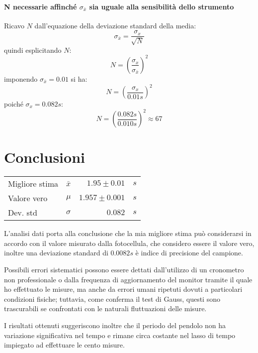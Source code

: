 \documentclass{article}
\begin{document}
	\noindent
	\paragraph{N necessarie affinché $\sigma_{\bar{x}}$ sia uguale alla sensibilità dello strumento}
	Ricavo $N$ dall'equazione della deviazione standard della media:
	\[
	\sigma_{\bar{x}} = \frac{\sigma_{x}}{\sqrt{N}} 
	\]
	quindi esplicitando $N$:
	\[
	N = \left(\frac{\sigma_x}{\sigma_{\bar{x}}}\right)^2
	\]
	imponendo $\sigma_{\bar{x}} = 0.01$ si ha:
	\[
	N = \left(\frac{\sigma_x}{0.01s}\right)^2
	\]
	poiché $\sigma_x = 0.082s$:
	\[
	N = \left(\frac{0.082s}{0.010s}\right)^2 \approx 67
	\]
	
	
	
\vspace{1.2cm}
	\section{Conclusioni}
	\textcolor{white}{ }
	
	\begin{minipage}[c]{1\textwidth}
	\centering
	\begin{tabular}{llrl}
		Migliore stima           & $\bar{x}$             & $1.95 \pm 0.01$        & $s$       \\
		Valore vero  & $\mu$ & $1.957 \pm 0.001$  & $s$ \\
		Dev. std                    & $\sigma$              & $0.082$      & $s$   \\
	\end{tabular}
	\end{minipage}
	\vspace{0.1cm}
	
	\noindent
	L'analisi dati porta alla conclusione che la mia migliore stima può considerarsi in accordo con il valore misurato dalla fotocellula, che considero essere il valore vero, inoltre una deviazione standard di $0.0082s$ è indice di precisione del campione. 
	
	Possibili errori sistematici possono essere dettati dall'utilizzo di un cronometro non professionale o dalla frequenza di aggiornamento del monitor tramite il quale ho effettuato le misure, ma anche da errori umani ripetuti dovuti a particolari condizioni fisiche; tuttavia, come conferma il test di Gauss, questi sono trascurabili se confrontati con le naturali fluttuazioni delle misure. 
	
	 I risultati ottenuti suggeriscono inoltre che il periodo del pendolo non ha variazione significativa nel tempo e rimane circa costante nel lasso di tempo impiegato ad effettuare le cento misure. 
	
\end{document}
